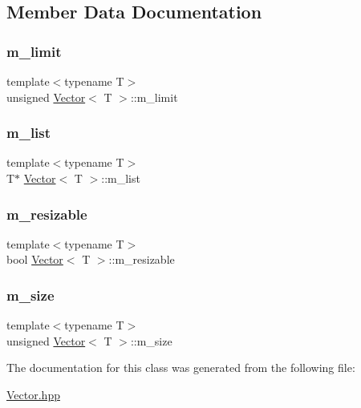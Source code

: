 \subsection{Member Data Documentation}
\mbox{\label{classVector_ae1d33e9478276ba3c9ecb5c1c9c19e51}} 
\subsubsection{\texorpdfstring{m\+\_\+limit}{m\_limit}}
{\footnotesize\ttfamily template$<$typename T$>$ \\
unsigned \hyperlink{classVector}{Vector}$<$ T $>$\+::m\+\_\+limit\hspace{0.3cm}{\ttfamily [private]}}

\mbox{\label{classVector_a6fa56a7d1cfb087e8caa82f071334e7c}} 
\subsubsection{\texorpdfstring{m\+\_\+list}{m\_list}}
{\footnotesize\ttfamily template$<$typename T$>$ \\
T$\ast$ \hyperlink{classVector}{Vector}$<$ T $>$\+::m\+\_\+list\hspace{0.3cm}{\ttfamily [private]}}

\mbox{\label{classVector_a99069135ae43a1ba51be987183079dc2}} 
\subsubsection{\texorpdfstring{m\+\_\+resizable}{m\_resizable}}
{\footnotesize\ttfamily template$<$typename T$>$ \\
bool \hyperlink{classVector}{Vector}$<$ T $>$\+::m\+\_\+resizable\hspace{0.3cm}{\ttfamily [private]}}

\mbox{\label{classVector_a827694a58c1ed73287b2321de5ec433a}} 
\subsubsection{\texorpdfstring{m\+\_\+size}{m\_size}}
{\footnotesize\ttfamily template$<$typename T$>$ \\
unsigned \hyperlink{classVector}{Vector}$<$ T $>$\+::m\+\_\+size\hspace{0.3cm}{\ttfamily [private]}}



The documentation for this class was generated from the following file\+:\begin{DoxyCompactItemize}
\item 
\hyperlink{Vector_8hpp}{Vector.\+hpp}\end{DoxyCompactItemize}
